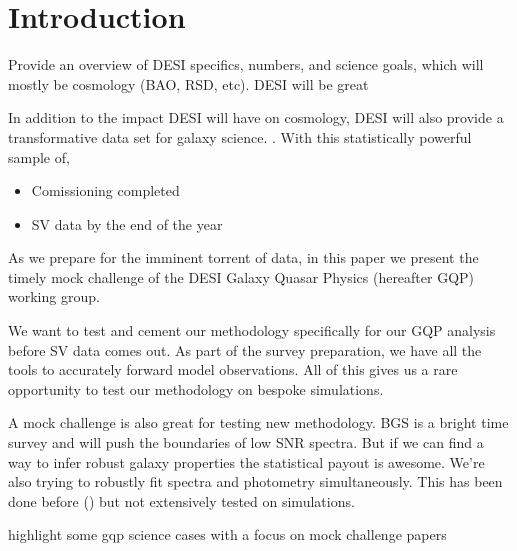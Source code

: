 \section{Introduction} \label{sec:intro} 
Provide an overview of DESI specifics, numbers, and science goals, which will 
mostly be cosmology (BAO, RSD, etc). DESI will be great

In addition to the impact DESI will have on cosmology, DESI will also provide a
transformative data set for galaxy science. .
With this statistically powerful sample of, 

\begin{itemize}
    \item Comissioning completed
    \item SV data by the end of the year
\end{itemize}
As we prepare for the imminent torrent of data, in this paper we present the
timely mock challenge of the DESI Galaxy Quasar Physics (hereafter GQP) working 
group.  

We want to test and cement our methodology specifically for our GQP 
analysis before SV data comes out. 
As part of the survey preparation, we have all the tools to accurately 
forward model observations. 
All of this gives us a rare opportunity to test our methodology on bespoke
simulations. 

A mock challenge is also great for testing new methodology.
BGS is a bright time survey and will push the boundaries of low SNR 
spectra. But if we can find a way to  infer robust galaxy properties the 
statistical payout is awesome.  
We're also trying to robustly fit spectra and photometry simultaneously. 
This has been done before () but not extensively tested 
on simulations. 

highlight some gqp science cases with a focus on mock challenge papers

